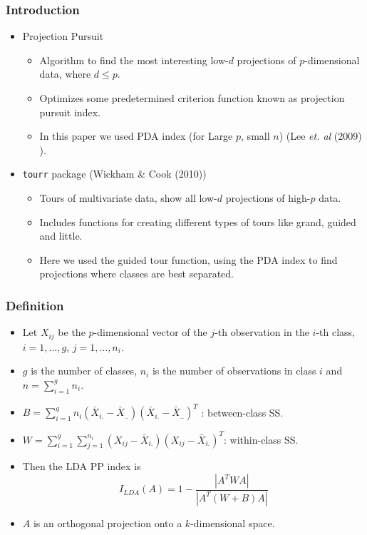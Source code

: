 \documentclass{beamer}
\begin{document}
\begin{frame}
\frametitle{Introduction}
\begin{itemize}
\item Projection Pursuit 
			\begin{itemize}
			\item Algorithm to find the most interesting low-$d$ projections of $p$-dimensional data,  where $d \le p$.
			\item Optimizes some predetermined criterion function known as projection pursuit index.
			\item In this paper we used PDA index (for Large $p$, small $n$) (Lee {\em et. al} (2009) ).
			\end{itemize}		
\item \texttt{tourr} package (Wickham \& Cook (2010)) 
			\begin{itemize}
			\item Tours of multivariate data, show all low-$d$ projections of high-$p$ data.  
			\item Includes functions for creating different types of tours like grand, guided and little.
			\item Here we used the guided tour function, using the PDA index to find projections where classes are best separated.
			\end{itemize}
\end{itemize}
\end{frame}


\begin{frame}
\frametitle{Definition}
\begin{itemize}
\item Let $X_{ij}$ be the $p$-dimensional vector of the $j$-th observation in the $i$-th class, $i = 1, \dots, g$, $j = 1, \dots, n_i$.
\item $g$ is the number of classes, $n_i$ is the number of observations in class $i$ and $n = \sum_{i=1}^g n_i$.
\item $B = \sum_{i=1}^g n_i (\bar{X}_{i.} - \bar{X}_{..})(\bar{X}_{i.} - \bar{X}_{..})^T$ : between-class SS.
\item $W = \sum_{i=1}^g \sum_{j=1}^{n_i} (X_{ij} - \bar{X}_{i.})(X_{ij} - \bar{X}_{i.})^T$: within-class SS.
\item Then the LDA PP index is 
$$I_{LDA}(A) = 1 - \frac{|A^TWA|}{|A^T(W + B)A|}$$
\item $A$ is an orthogonal projection onto a $k$-dimensional space.
\end{itemize}
\end{frame}
\end{document}
